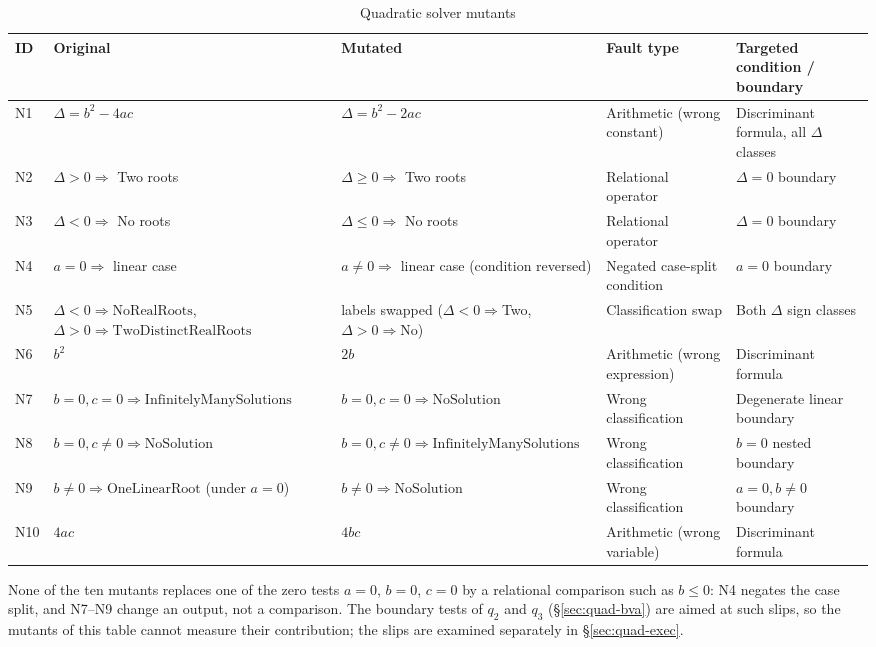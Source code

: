 \documentclass[11pt,a4paper]{article}
\begin{document}
\begin{table}[H]
\centering
\caption{Quadratic solver mutants}
\label{tab:quad-mutants}
\small
\begin{tabularx}{\textwidth}{l L{3.7cm} L{4.0cm} L{2.3cm} Y}
\toprule
ID & Original & Mutated & Fault type & Targeted condition / boundary \\
\midrule
N1 & \(\Delta=b^2-4ac\) & \(\Delta=b^2-2ac\) & Arithmetic (wrong constant) &
Discriminant formula, all \(\Delta\) classes \\
N2 & \(\Delta>0\Rightarrow\) Two roots & \(\Delta\ge0\Rightarrow\) Two roots &
Relational operator & \(\Delta=0\) boundary \\
N3 & \(\Delta<0\Rightarrow\) No roots & \(\Delta\le0\Rightarrow\) No roots &
Relational operator & \(\Delta=0\) boundary \\
N4 & \(a=0\Rightarrow\) linear case & \(a\ne0\Rightarrow\) linear case
(condition reversed) & Negated case-split condition & \(a=0\) boundary \\
N5 & \(\Delta<0\Rightarrow\mathrm{NoRealRoots}\),
\(\Delta>0\Rightarrow\mathrm{TwoDistinctRealRoots}\) &
labels swapped (\(\Delta<0\Rightarrow\)Two, \(\Delta>0\Rightarrow\)No) &
Classification swap & Both \(\Delta\) sign classes \\
N6 & \(b^2\) & $2b$ & Arithmetic (wrong expression) & Discriminant formula \\
N7 & \(b=0,c=0\Rightarrow\mathrm{InfinitelyManySolutions}\) &
\(b=0,c=0\Rightarrow\mathrm{NoSolution}\) & Wrong classification & Degenerate
linear boundary \\
N8 & \(b=0,c\ne0\Rightarrow\mathrm{NoSolution}\) &
\(b=0,c\ne0\Rightarrow\mathrm{InfinitelyManySolutions}\) & Wrong classification
& \(b=0\) nested boundary \\
N9 & \(b\ne0\Rightarrow\mathrm{OneLinearRoot}\) (under \(a=0\)) &
\(b\ne0\Rightarrow\mathrm{NoSolution}\) & Wrong classification & \(a=0,b\ne0\)
boundary \\
N10 & $4ac$ & $4bc$ & Arithmetic (wrong variable) & Discriminant formula \\
\bottomrule
\end{tabularx}
\end{table}

None of the ten mutants replaces one of the zero tests \(a=0\), \(b=0\),
\(c=0\) by a relational comparison such as \(b\le0\): N4 negates the case
split, and N7--N9 change an output, not a comparison. The boundary tests of
\(q_2\) and \(q_3\) (\S\ref{sec:quad-bva}) are aimed at such slips, so the
mutants of this table cannot measure their contribution; the slips are
examined separately in \S\ref{sec:quad-exec}.
\end{document}

